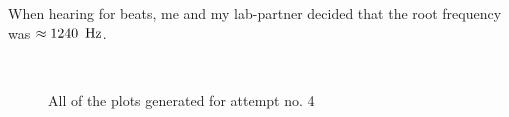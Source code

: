 \documentclass[11pt,a4paper]{article}
\begin{document}
    When hearing for beats, me and my lab-partner decided that the root frequency was $\approx 1240\enspace\textup{Hz}$.
    \newline
    \begin{figure}[H]
      \centering
       \\
      \caption{All of the plots generated for attempt no. 4}
      \label{fig:sound_exp1}
    \end{figure}
\end{document}
